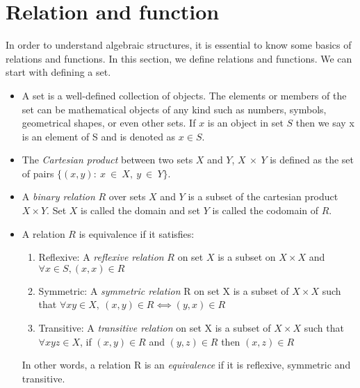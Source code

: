 \section{Relation and function}
In order to understand algebraic structures, it is essential to know some basics
of relations and functions. In this section, we define relations and functions.
We can start with defining a set.
\begin{itemize}
\item A set is a well-defined collection of objects. The elements or members of the
set can be mathematical objects of any kind such as numbers, symbols, geometrical
shapes, or even other sets. If $x$ is an object in set $S$ then we say x is an
element of S and is denoted as $x \in S$.

\item The \emph{Cartesian product} between two sets $X$ and $Y$,  $X \ \times\
Y$ is defined as the set of pairs \(\{(x,y) :\ x \ \in\ X,\ y\ \in\ Y \}\). 

\item A \emph{binary relation}  $R$ over sets $X$ and $Y$ is a subset of the
cartesian product $X \times Y$. Set $X$ is called the domain and set $Y$ is
called the codomain of $R$.

\item A relation $R$ is equivalence if it satisfies:
\begin{enumerate}
    \item Reflexive: A \emph{reflexive relation} $R$ on set $X$ is a subset on
\(X \times X\) and $\forall x \in S, (x,x) \in R$

    \item Symmetric: A \emph{symmetric relation} R on set X is a subset of \(X
\times X\) such that \(\forall x y \in X,\ (x,y) \in R ⟺ (y,x) \in R \)

    \item Transitive: A \emph{transitive relation} on set X is a subset of \(X
\times X\) such that \(∀ x y z \in X \), if \((x,y) \in R\) and \((y,z) \in R \)
then \((x,z) \in R\)
\end{enumerate}
In other words, a relation R is an \emph{equivalence} if it is reflexive, symmetric and transitive.


\end{itemize}
